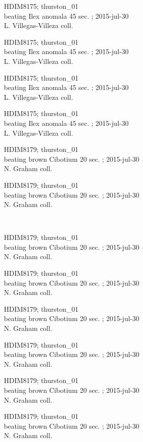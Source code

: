 \documentclass[2pt]{extarticle}
\begin{document}
\noindent
\parbox{0.16\textwidth}{\tiny \raggedright \rule[-0.3\baselineskip]{0pt}{10pt}HDIM8175; thurston\_01\\ beating Ilex anomala 45 sec. ; 2015-jul-30\\ L. Villegas-Villeza coll.}
\parbox{0.16\textwidth}{\tiny \raggedright \rule[-0.3\baselineskip]{0pt}{10pt}HDIM8175; thurston\_01\\ beating Ilex anomala 45 sec. ; 2015-jul-30\\ L. Villegas-Villeza coll.}
\parbox{0.16\textwidth}{\tiny \raggedright \rule[-0.3\baselineskip]{0pt}{10pt}HDIM8175; thurston\_01\\ beating Ilex anomala 45 sec. ; 2015-jul-30\\ L. Villegas-Villeza coll.}
\parbox{0.16\textwidth}{\tiny \raggedright \rule[-0.3\baselineskip]{0pt}{10pt}HDIM8175; thurston\_01\\ beating Ilex anomala 45 sec. ; 2015-jul-30\\ L. Villegas-Villeza coll.}
\parbox{0.16\textwidth}{\tiny \raggedright \rule[-0.3\baselineskip]{0pt}{10pt}HDIM8179; thurston\_01\\ beating brown Cibotium 20 sec. ; 2015-jul-30\\ N. Graham coll.}
\parbox{0.16\textwidth}{\tiny \raggedright \rule[-0.3\baselineskip]{0pt}{10pt}HDIM8179; thurston\_01\\ beating brown Cibotium 20 sec. ; 2015-jul-30\\ N. Graham coll.} \\ 
\vspace{0.001in} 

\noindent
\parbox{0.16\textwidth}{\tiny \raggedright \rule[-0.3\baselineskip]{0pt}{10pt}HDIM8179; thurston\_01\\ beating brown Cibotium 20 sec. ; 2015-jul-30\\ N. Graham coll.}
\parbox{0.16\textwidth}{\tiny \raggedright \rule[-0.3\baselineskip]{0pt}{10pt}HDIM8179; thurston\_01\\ beating brown Cibotium 20 sec. ; 2015-jul-30\\ N. Graham coll.}
\parbox{0.16\textwidth}{\tiny \raggedright \rule[-0.3\baselineskip]{0pt}{10pt}HDIM8179; thurston\_01\\ beating brown Cibotium 20 sec. ; 2015-jul-30\\ N. Graham coll.}
\parbox{0.16\textwidth}{\tiny \raggedright \rule[-0.3\baselineskip]{0pt}{10pt}HDIM8179; thurston\_01\\ beating brown Cibotium 20 sec. ; 2015-jul-30\\ N. Graham coll.}
\parbox{0.16\textwidth}{\tiny \raggedright \rule[-0.3\baselineskip]{0pt}{10pt}HDIM8179; thurston\_01\\ beating brown Cibotium 20 sec. ; 2015-jul-30\\ N. Graham coll.}
\parbox{0.16\textwidth}{\tiny \raggedright \rule[-0.3\baselineskip]{0pt}{10pt}HDIM8179; thurston\_01\\ beating brown Cibotium 20 sec. ; 2015-jul-30\\ N. Graham coll.} \\ 
\vspace{0.001in} 
\end{document}
